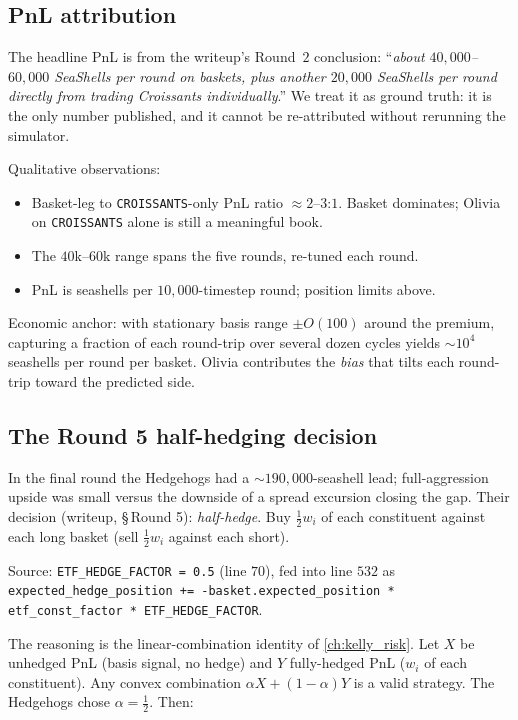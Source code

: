 \subsection{PnL attribution}
\label{sec:ch11_hh_pnl}

The headline PnL is from the writeup's Round~$2$ conclusion:
``\emph{about $40{,}000$--$60{,}000$ SeaShells per round on
baskets, plus another $20{,}000$ SeaShells per round directly
from trading Croissants individually}.'' We treat it as ground
truth: it is the only number published, and it cannot be
re-attributed without rerunning the simulator.

Qualitative observations:

\begin{itemize}
  \item Basket-leg to \texttt{CROISSANTS}-only PnL ratio $\approx
  2$--$3$:$1$. Basket dominates; Olivia on \texttt{CROISSANTS}
  alone is still a meaningful book.
  \item The $40$k--$60$k range spans the five rounds, re-tuned
  each round.
  \item PnL is seashells per $10{,}000$-timestep round; position
  limits above.
\end{itemize}

Economic anchor: with stationary basis range $\pm O(100)$ around
the premium, capturing a fraction of each round-trip over several
dozen cycles yields $\sim 10^4$ seashells per round per basket.
Olivia contributes the \emph{bias} that tilts each round-trip
toward the predicted side.

\subsection{The Round 5 half-hedging decision}
\label{sec:ch11_hh_half_hedge}

In the final round the Hedgehogs had a
$\sim$$190{,}000$-seashell lead; full-aggression upside was small
versus the downside of a spread excursion closing the gap. Their
decision (writeup, \S\,Round 5): \emph{half-hedge}. Buy
$\tfrac{1}{2} w_i$ of each constituent against each long basket
(sell $\tfrac{1}{2} w_i$ against each short).

Source: \texttt{ETF\_HEDGE\_FACTOR = 0.5} (line $70$), fed into
line $532$ as
\texttt{expected\_hedge\_position += -basket.expected\_position
* etf\_const\_factor * ETF\_HEDGE\_FACTOR}.

The reasoning is the linear-combination identity of
\cref{ch:kelly_risk}. Let $X$ be unhedged PnL (basis signal, no
hedge) and $Y$ fully-hedged PnL ($w_i$ of each constituent). Any
convex combination $\alpha X + (1-\alpha) Y$ is a valid strategy.
The Hedgehogs chose $\alpha = \tfrac{1}{2}$. Then:

